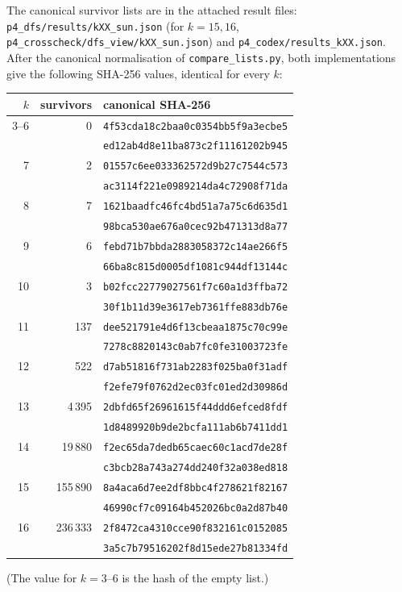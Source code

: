 \documentclass[11pt]{article}
\theoremstyle{definition}
\theoremstyle{remark}
\begin{document}
\label{sec:lists}
The canonical survivor lists are in the attached result files: \texttt{p4\_dfs/results/kXX\_sun.json}
(for $k=15,16$, \texttt{p4\_crosscheck/dfs\_view/kXX\_sun.json}) and
\texttt{p4\_codex/results\_kXX.json}. After the canonical normalisation of \texttt{compare\_lists.py},
both implementations give the following SHA-256 values, identical for every $k$:
\begin{center}\small
\begin{tabular}{r|r|l}
$k$ & survivors & canonical SHA-256\\\hline
3--6 & 0 & \texttt{4f53cda18c2baa0c0354bb5f9a3ecbe5}\\
 & & \texttt{ed12ab4d8e11ba873c2f11161202b945}\\
7 & 2 & \texttt{01557c6ee033362572d9b27c7544c573}\\
 & & \texttt{ac3114f221e0989214da4c72908f71da}\\
8 & 7 & \texttt{1621baadfc46fc4bd51a7a75c6d635d1}\\
 & & \texttt{98bca530ae676a0cec92b471313d8a77}\\
9 & 6 & \texttt{febd71b7bbda2883058372c14ae266f5}\\
 & & \texttt{66ba8c815d0005df1081c944df13144c}\\
10 & 3 & \texttt{b02fcc22779027561f7c60a1d3ffba72}\\
 & & \texttt{30f1b11d39e3617eb7361ffe883db76e}\\
11 & 137 & \texttt{dee521791e4d6f13cbeaa1875c70c99e}\\
 & & \texttt{7278c8820143c0ab7fc0fe31003723fe}\\
12 & 522 & \texttt{d7ab51816f731ab2283f025ba0f31adf}\\
 & & \texttt{f2efe79f0762d2ec03fc01ed2d30986d}\\
13 & 4\,395 & \texttt{2dbfd65f26961615f44ddd6efced8fdf}\\
 & & \texttt{1d8489920b9de2bcfa111ab6b7411dd1}\\
14 & 19\,880 & \texttt{f2ec65da7dedb65caec60c1acd7de28f}\\
 & & \texttt{c3bcb28a743a274dd240f32a038ed818}\\
15 & 155\,890 & \texttt{8a4aca6d7ee2df8bbc4f278621f82167}\\
 & & \texttt{46990cf7c09164b452026bc0a2d87b40}\\
16 & 236\,333 & \texttt{2f8472ca4310cce90f832161c0152085}\\
 & & \texttt{3a5c7b79516202f8d15ede27b81334fd}\\
\end{tabular}
\end{center}
(The value for $k=3$--$6$ is the hash of the empty list.)
\end{document}

